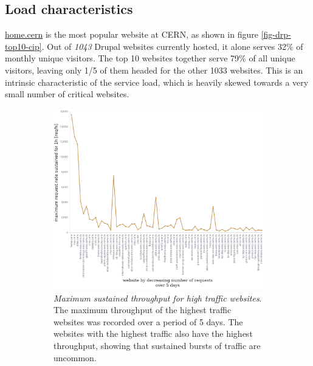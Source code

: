 \subsection{Load characteristics}
\label{sec-load}

\href{https://home.cern/}{home.cern} is the most popular website at CERN, as shown in figure \ref{fig-drp-top10-cip}.
Out of \emph{1043} Drupal websites currently hosted, it alone serves 32\% of monthly unique visitors.
The top 10 websites together serve 79\% of all unique visitors, leaving only 1/5 of them headed for the other 1033 websites.
This is an intrinsic characteristic of the service load, which is heavily skewed towards a very small number of critical websites.

\begin{figure}[t]
    \centering
    \vspace{-3em}
    \begin{subfigure}[b]{.7\textwidth}
        \centering
        \includegraphics[width=\textwidth]{figures/website-bandwidth}
        \caption{\emph{Maximum sustained throughput for high traffic websites}.
          The maximum throughput of the highest traffic websites was recorded over a period of 5 days.
          The websites with the highest traffic also have the highest throughput, showing that sustained bursts of traffic are uncommon.}
        \label{fig:website_bandwidth}
    \end{subfigure}
    \hfill
    \begin{subfigure}[b]{.25\textwidth}

\end{subfigure}
\end{figure}
